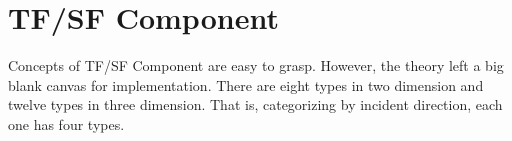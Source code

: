 \section{TF/SF Component}
Concepts of TF/SF Component are easy to grasp. However, the theory left a big blank canvas for implementation. There are
eight types in two dimension and twelve types in three dimension. That is, categorizing by incident direction, each one
has four types.
